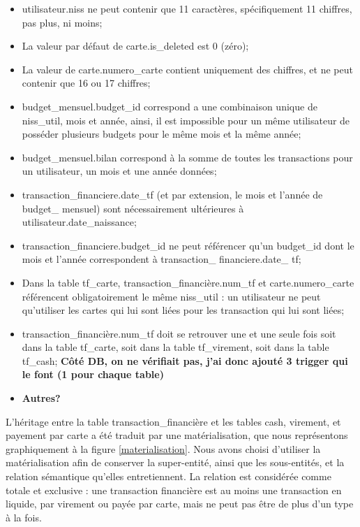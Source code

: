 \documentclass[a4paper,12pt]{article}
\begin{document}
\begin{itemize}
\item utilisateur.niss ne peut contenir que 11 caractères, spécifiquement 11 chiffres, pas plus, ni moins;
\item La valeur par défaut de carte.is\_deleted est 0 (zéro);
\item La valeur de carte.numero\_carte contient uniquement des chiffres, et ne peut contenir que 16 ou 17 chiffres;
\item budget\_mensuel.budget\_id correspond a une combinaison unique de niss\_util, mois et année, ainsi, il est impossible pour un même utilisateur de posséder plusieurs budgets pour le même mois et la même année;
\item budget\_mensuel.bilan correspond à la somme de toutes les transactions pour un utilisateur, un mois et une année données;
\item transaction\_financiere.date\_tf (et par extension, le mois et l'année de budget\_ mensuel) sont nécessairement ultérieures à utilisateur.date\_naissance;
\item transaction\_financiere.budget\_id ne peut référencer qu'un budget\_id dont le mois et l'année correspondent à transaction\_ financiere.date\_ tf;
\item Dans la table tf\_carte, transaction\_financière.num\_tf et carte.numero\_carte référencent obligatoirement le même niss\_util : un utilisateur ne peut qu'utiliser les cartes qui lui sont liées pour les transaction qui lui sont liées;
\item transaction\_financière.num\_tf doit se retrouver une et une seule fois soit dans la table tf\_carte, soit dans la table tf\_virement, soit dans la table tf\_cash; \textbf{Côté DB, on ne vérifiait pas, j'ai donc ajouté 3 trigger qui le font (1 pour chaque table)}
\item \textbf{Autres?}
\end{itemize}

L'héritage entre la table transaction\_financière et les tables cash, virement, et payement par carte a été traduit par une matérialisation, que nous représentons graphiquement à la figure \ref{materialisation}.
Nous avons choisi d'utiliser la matérialisation afin de conserver la super-entité, ainsi que les sous-entités, et la relation sémantique qu'elles entretiennent.
La relation est considérée comme totale et exclusive : une transaction financière est au moins une transaction en liquide, par virement ou payée par carte, mais ne peut pas être de plus d'un type à la fois.
\end{document}
